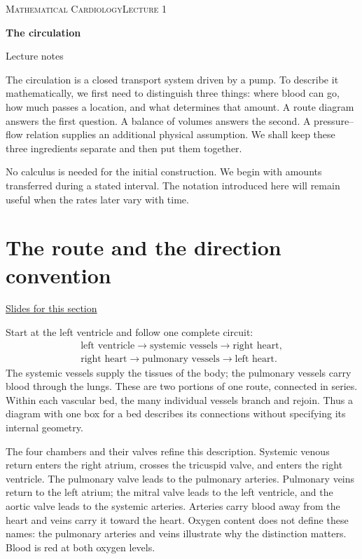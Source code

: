 \documentclass[11pt,letterpaper]{article}
\theoremstyle{definition}\newtheorem{definition}{Definition}\newtheorem{example}{Example}
\numberwithin{equation}{section}
\begin{document}
{\small\scshape Mathematical Cardiology\hfill Lecture 1}\par\medskip
{\raggedright{}\LARGE\bfseries\color{ink} The circulation\par}\medskip
{\small Lecture notes}\par\bigskip
The circulation is a closed transport system driven by a pump. To describe it mathematically, we first need to distinguish three things: where blood can go, how much passes a location, and what determines that amount. A route diagram answers the first question. A balance of volumes answers the second. A pressure--flow relation supplies an additional physical assumption. We shall keep these three ingredients separate and then put them together.

No calculus is needed for the initial construction. We begin with amounts transferred during a stated interval. The notation introduced here will remain useful when the rates later vary with time.

\section{The route and the direction convention}
\hypertarget{note-the-route-and-the-direction-convention}{}\label{note:the-route-and-the-direction-convention}
{\small \href{slides.html\#frame=the-circulation-as-a-closed-route\&step=1}{Slides for this section}}\par
Start at the left ventricle and follow one complete circuit:
\[
\begin{gathered}
\text{left ventricle}\longrightarrow\text{systemic vessels}\longrightarrow\text{right heart},\\
\text{right heart}\longrightarrow\text{pulmonary vessels}\longrightarrow\text{left heart}.
\end{gathered}
\]
The systemic vessels supply the tissues of the body; the pulmonary vessels carry blood through the lungs. These are two portions of one route, connected in series. Within each vascular bed, the many individual vessels branch and rejoin. Thus a diagram with one box for a bed describes its connections without specifying its internal geometry.

The four chambers and their valves refine this description. Systemic venous return enters the right atrium, crosses the tricuspid valve, and enters the right ventricle. The pulmonary valve leads to the pulmonary arteries. Pulmonary veins return to the left atrium; the mitral valve leads to the left ventricle, and the aortic valve leads to the systemic arteries. Arteries carry blood away from the heart and veins carry it toward the heart. Oxygen content does not define these names: the pulmonary arteries and veins illustrate why the distinction matters. Blood is red at both oxygen levels.
\end{document}

